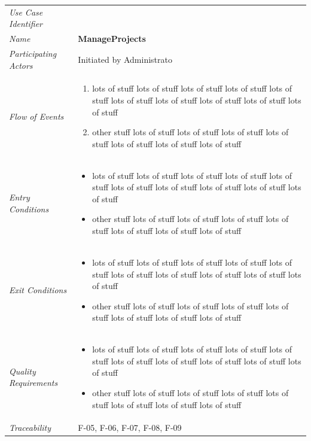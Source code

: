 \documentclass[12pt,letterpaper]{article}
\begin{document}
\begin{center}
    \begin{tabu} to 
        \toprule
		Use Case Identifier & \manageprojects{} \\
		Name & {\bf ManageProjects} \\
        Participating Actors & Initiated by Administrato \\
		Flow of Events & 
	    \begin{enumerate}[topsep=-1em]
		    \item lots of stuff lots of stuff lots of stuff lots of stuff lots of stuff lots of stuff lots of stuff lots of stuff lots of stuff lots of stuff
		    \item other stuff lots of stuff lots of stuff lots of stuff lots of stuff lots of stuff lots of stuff lots of stuff
		\end{enumerate} \\

		Entry Conditions &
		\begin{itemize}[topsep=-1em]
		    \item lots of stuff lots of stuff lots of stuff lots of stuff lots of stuff lots of stuff lots of stuff lots of stuff lots of stuff lots of stuff
		    \item other stuff lots of stuff lots of stuff lots of stuff lots of stuff lots of stuff lots of stuff lots of stuff
        \end{itemize} \\

		Exit Conditions &
		\begin{itemize}[topsep=-1em]
		    \item lots of stuff lots of stuff lots of stuff lots of stuff lots of stuff lots of stuff lots of stuff lots of stuff lots of stuff lots of stuff
		    \item other stuff lots of stuff lots of stuff lots of stuff lots of stuff lots of stuff lots of stuff lots of stuff
        \end{itemize} \\

		Quality Requirements &
		\begin{itemize}[topsep=-1em]
		    \item lots of stuff lots of stuff lots of stuff lots of stuff lots of stuff lots of stuff lots of stuff lots of stuff lots of stuff lots of stuff
		    \item other stuff lots of stuff lots of stuff lots of stuff lots of stuff lots of stuff lots of stuff lots of stuff
        \end{itemize} \\

		Traceability & F-05, F-06, F-07, F-08, F-09\\
        \toprule
    \end{tabu}
\end{center}
\end{document}
